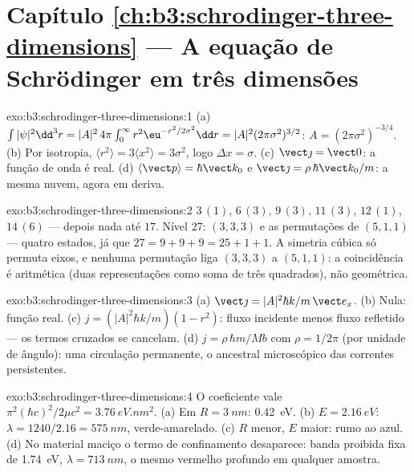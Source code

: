 \section*{Capítulo \ref{ch:b3:schrodinger-three-dimensions} --- A equação de Schrödinger em três dimensões}

\begin{solution}{exo:b3:schrodinger-three-dimensions:1}
(a) $\int|\psi|^2\dd^3r = |A|^2\,4\pi\int_0^\infty r^2\eu^{-r^2/2
\sigma^2}\dd r = |A|^2(2\pi\sigma^2)^{3/2}$: $A = (2\pi\sigma^2)^{
-3/4}$. (b) Por isotropia, $\langle r^2\rangle = 3\langle x^2\rangle =
3\sigma^2$, logo $\Delta x = \sigma$. (c) $\vect\jmath = \vect 0$: a
função de onda é real. (d) $\langle\vect p\rangle = \hbar\vect k_0$
e $\vect\jmath = \rho\,\hbar\vect k_0/m$: a mesma nuvem, agora em
deriva.
\end{solution}

\begin{solution}{exo:b3:schrodinger-three-dimensions:2}
$3\,(1)$, $6\,(3)$, $9\,(3)$, $11\,(3)$, $12\,(1)$, $14\,(6)$ ---
depois nada até $17$. Nível $27$: $(3,3,3)$ e as permutações de
$(5,1,1)$ --- quatro estados, já que $27 = 9+9+9 = 25+1+1$. A simetria
cúbica só permuta eixos, e nenhuma permutação liga $(3,3,3)$ a
$(5,1,1)$: a coincidência é aritmética (duas representações como soma
de três quadrados), não geométrica.
\end{solution}

\begin{solution}{exo:b3:schrodinger-three-dimensions:3}
(a) $\vect\jmath = |A|^2\hbar k/m\,\vect e_x$. (b) Nula: função real.
(c) $j = (|A|^2\hbar k/m)(1 - r^2)$: fluxo incidente menos fluxo
refletido --- os termos cruzados se cancelam. (d) $j = \rho\,\hbar
m/Mb$ com $\rho = 1/2\pi$ (por unidade de ângulo): uma circulação
permanente, o ancestral microscópico das correntes persistentes.
\end{solution}

\begin{solution}{exo:b3:schrodinger-three-dimensions:4}
O coeficiente vale $\pi^2(\hbar c)^2/2\mu c^2 = \qty{3.76}{eV.nm^2}$.
(a) Em $R = \qty{3}{nm}$: \qty{0.42}{eV}. (b) $E = \qty{2.16}{eV}$:
$\lambda = 1240/2.16 = \qty{575}{nm}$, verde-amarelado. (c) $R$ menor,
$E$ maior: rumo ao azul. (d) No material maciço o termo de
confinamento desaparece: banda proibida fixa de \qty{1.74}{eV},
$\lambda = \qty{713}{nm}$, o mesmo vermelho profundo em qualquer
amostra.
\end{solution}

